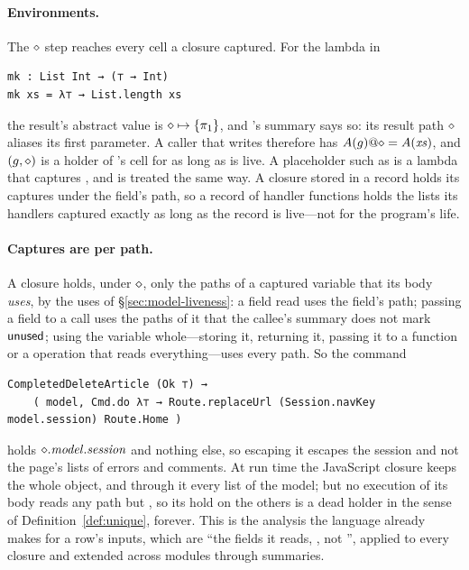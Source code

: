 \paragraph{Environments.} The $\diamond$ step reaches every cell a closure captured. For the lambda in
\begin{Verbatim}
mk : List Int → (⊤ → Int)
mk xs = λ⊤ → List.length xs
\end{Verbatim}
the result's abstract value is $\diamond \mapsto \{\pi_1\}$, and 's summary says so: its result
path $\diamond$ aliases its first parameter. A caller that writes  therefore has
$A(g)@\diamond = A(\mathit{xs})$, and $(g, \diamond)$ is a holder of 's cell for as long as 
is live. A placeholder such as  is a lambda that captures , and is
treated the same way. A closure stored in a record holds its captures under the field's path, so a
record of handler functions holds the lists its handlers captured exactly as long as the record is
live---not for the program's life.

\paragraph{Captures are per path.} A closure holds, under $\diamond$, only the paths of a captured variable
that its body \emph{uses}, by the uses of \S\ref{sec:model-liveness}: a field read uses the field's
path; passing a field to a call uses the paths of it that the callee's summary does not mark
$\mathsf{unused}$; using the variable whole---storing it, returning it, passing it to a function or a
 operation that reads everything---uses every path. So the command
\begin{Verbatim}
CompletedDeleteArticle (Ok ⊤) →
    ( model, Cmd.do λ⊤ → Route.replaceUrl (Session.navKey model.session) Route.Home )
\end{Verbatim}
holds $\diamond.\mathit{model}.\mathit{session}$ and nothing else, so escaping it escapes the session and not
the page's lists of errors and comments. At run time the JavaScript closure keeps the whole 
object, and through it every list of the model; but no execution of its body reads any path but
, so its hold on the others is a dead holder in the sense of
Definition~\ref{def:unique}, forever. This is the analysis the language already makes for a row's inputs,
which are ``the fields it reads, , not '', applied to every closure and
extended across modules through summaries.

